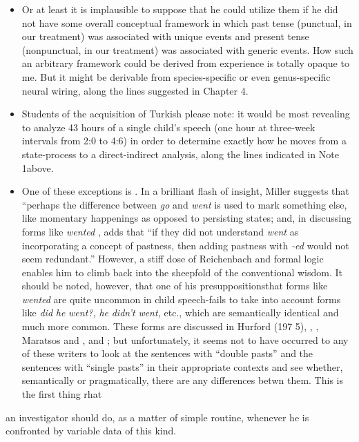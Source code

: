 \begin{itemize}
\begin{itemize}
\begin{itemize}
\begin{itemize}
\begin{itemize}
\begin{itemize}
\begin{itemize}
\begin{itemize}
\item Or at least it is implausible to suppose that he could utilize them if he did not have some overall conceptual framework in which past tense (punctual, in our treatment) was associated with unique events and present tense (nonpunctual, in our treatment) was associ\-ated with generic events. How such an arbitrary framework could be derived from experience is totally opaque to me. But it might be derivable from species-specific or even genus-specific neural wiring, along the lines suggested in Chapter 4.
\item Students of the acquisition of Turkish please note: it would be most revealing to analyze 43 hours of a single child's speech (one hour at three-week intervals from 2:0 to 4:6) in order to determine exactly how he moves from a state-process to a direct-indirect analysis, along the lines indicated in Note 1above.
\item One of these exceptions is \citet{Miller1978}. In a brilliant flash of insight, Miller suggests that ``perhaps the difference between \textit{go} and \textit{went} is used to mark something else, like momentary happen\-ings as opposed to persisting states{\textquotedbl}; and, in discussing forms like \textit{wented} , adds that ``if they did not understand \textit{went} as incorporating a concept of pastness, then adding pastness with \textit{{}-ed} would not seem redundant.'' However, a stiff dose of Reichenbach and formal logic enables him to climb back into the sheepfold of the conventional wisdom. It should be noted, however, that one of his presuppositions\-that forms like \textit{wented} are quite uncommon in child speech-fails to take into account forms like \textit{did} \textit{he} \textit{went?,} \textit{he} \textit{didn't} \textit{went,} etc., which are semantically identical and much more common. These forms are discussed in Hurford (197 5), \citet{Kuczaj1976}, \citet{Fay1978}, Maratsos and \citet{Kuczaj1978}, and \citet{ErreichEtAl1980}; but unfortunately, it seems not to have occurred to any of these writers to look at the sentences with ``double pasts'' and the sentences with ``single pasts'' in their appropriate contexts and see whether, semantically or pragmatically, there are any differences betwn them. This is the first thing rhat
\end{itemize}


an investigator should do, as a matter of simple routine, whenever he is confronted by variable data of this kind.


\end{itemize}
\end{itemize}
\end{itemize}
\end{itemize}
\end{itemize}
\end{itemize}
\end{itemize}
